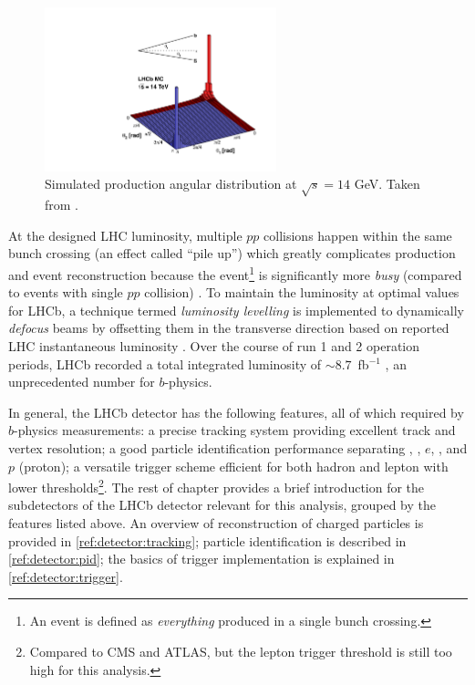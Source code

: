 \begin{figure}[!htb]
    \centering
    \includegraphics[width=0.6\textwidth]{./figs-detector/14_rad_acc_scheme_right.pdf}
    \caption{
        Simulated \bbbar production angular distribution at $\sqrt{s} = 14$ GeV.
        Taken from \cite{LHCb_bb_prod_angle}.
    }
    \label{fig:bbbar-prod-angular}
\end{figure}

At the designed LHC luminosity, multiple $pp$ collisions happen within the
same bunch crossing (an effect called ``pile up'')
which greatly complicates \bbbar production and event reconstruction because
the event\footnote{
    An event is defined as \emph{everything} produced in a single bunch
    crossing.
} is significantly more \emph{busy}
(compared to events with single $pp$ collision)
\cite{Altarelli_2008}.
To maintain the luminosity at optimal values for LHCb,
a technique termed \emph{luminosity levelling} is implemented to dynamically
\emph{defocus} beams by offsetting them in the transverse direction based
on reported LHC instantaneous luminosity
\cite{https://doi.org/10.5170/cern-2014-004.183}.
Over the course of run 1 and 2 operation periods, LHCb recorded a total
integrated luminosity of $\sim 8.7$~fb$^{-1}$
\cite{LHCb_lumi},
an unprecedented number for $b$-physics.

In general, the LHCb detector has the following features,
all of which required by $b$-physics measurements:
a precise tracking system providing excellent track and vertex resolution;
a good particle identification performance separating \pion, \kaon, $e$, \muon,
and $p$ (proton);
a versatile trigger scheme efficient for both hadron and lepton
with lower \pt thresholds\footnote{
    Compared to CMS and ATLAS, but the lepton trigger \pt threshold is still too
    high for this analysis.
}.
The rest of chapter provides a brief introduction for the subdetectors of the
LHCb detector relevant for this analysis, grouped by the features listed above.
An overview of reconstruction of charged particles is provided in
\cref{ref:detector:tracking};
particle identification is described in \cref{ref:detector:pid};
the basics of trigger implementation is explained in
\cref{ref:detector:trigger}.


